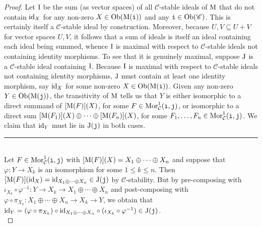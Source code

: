 \noindent\begin{proof} Let $\textnormal{I}$ be the sum (as vector spaces) of all $\mathscr{C}$-stable ideals of $\textnormal{M}$ that do not contain $\textnormal{id}_X$ for any non-zero $X \in \textnormal{Ob}(\textnormal{M}(\textnormal{\texttt{i}}))$ and any $\textnormal{\texttt{i}} \in \textnormal{Ob}(\mathscr{C})$. This is certainly itself a $\mathscr{C}$-stable ideal by construction. Moreover, because $U, V \subseteq U + V$ for vector spaces $U, V$, it follows that a sum of ideals is itself an ideal containing each ideal being summed, whence $\textnormal{I}$ is maximal with respect to $\mathscr{C}$-stable ideals not containing identity morphisms. To see that it is genuinely maximal, suppose $\textnormal{J}$ is a $\mathscr{C}$-stable ideal containing $\textnormal{I}$. %
Because $\textnormal{I}$ is maximal with respect to $\mathscr{C}$-stable ideals not containing identity morphisms, $\textnormal{J}$ must contain at least one identity morphism, say $\textnormal{id}_X$ for some non-zero $X \in \textnormal{Ob}(\textnormal{M}(\textnormal{\texttt{i}}))$. Given any non-zero $Y \in \textnormal{Ob}(\textnormal{M}(\textnormal{\texttt{j}}))$, the transitivity of $\textnormal{M}$ tells us that $Y$ is either isomorphic to a direct summand of $[\textnormal{M}(F)](X)$, for some $F \in \textnormal{Mor}_\mathcal{C}^1(\textnormal{\texttt{i}}, \textnormal{\texttt{j}})$, or isomorphic to a direct sum $[\textnormal{M}(F_1)](X) \oplus \cdots \oplus [\textnormal{M}(F_n)](X)$, for some $F_1, \dots, F_n \in \textnormal{Mor}_\mathcal{C}^1(\textnormal{\texttt{i}}, \textnormal{\texttt{j}})$. We claim that $\textnormal{id}_Y$ must lie in $\textnormal{J}(\textnormal{\texttt{j}})$ in both cases.\\[-1.5\baselineskip]
\begin{center}
\rule{0.5\linewidth}{1pt}
\end{center}
\noindent\\[-\baselineskip]
\noindent Let $F \in \textnormal{Mor}_\mathcal{C}^1(\textnormal{\texttt{i}}, \textnormal{\texttt{j}})$ with $[\textnormal{M}(F)](X) = X_1 \oplus \cdots \oplus X_n$ and suppose that $\varphi : Y \to X_k$ is an isomorphism for some $1 \leq k \leq n$. Then $[\textnormal{M}(F)](\textnormal{id}_X) = \textnormal{id}_{X_1 \oplus \cdots \oplus X_n} \in \textnormal{J}(\textnormal{\texttt{j}})$ by $\mathscr{C}$-stability. But by pre-composing with $\iota_{X_k} \circ \varphi^{-1} : Y \to X_k \to X_1 \oplus \cdots \oplus X_n$ and post-composing with $\varphi \circ \pi_{X_k} : X_1 \oplus \cdots \oplus X_n \to X_k \to Y$, we obtain that $\textnormal{id}_Y = (\varphi \circ \pi_{X_k}) \circ \textnormal{id}_{X_1 \oplus \cdots \oplus X_n} \circ (\iota_{X_k} \circ \varphi^{-1}) \in \textnormal{J}(\textnormal{\texttt{j}})$.\\[-1.5\baselineskip]

\end{proof}
